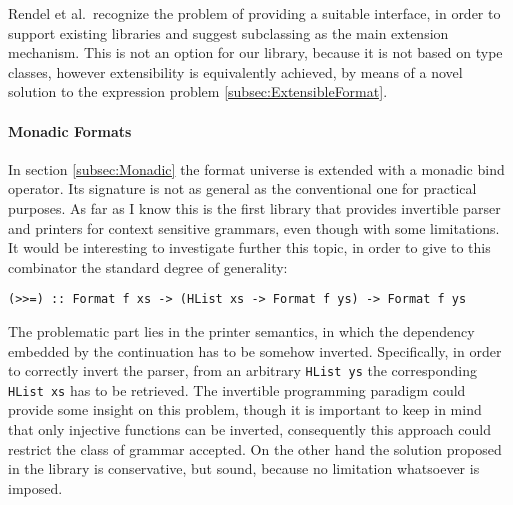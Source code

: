 \documentclass[../Thesis.tex]{subfiles}
\begin{document}
Rendel et al.\ recognize the problem of providing a suitable interface,
in order to support existing libraries and suggest subclassing
as the main extension mechanism. This is not an option
for our library, because it is not based on type classes, however
extensibility is equivalently achieved, by means of a novel
solution to the expression problem \ref{subsec:ExtensibleFormat}.

\paragraph{Monadic Formats}
In section \ref{subsec:Monadic} the format universe is extended 
with a monadic bind operator. 
Its signature is not as general as the conventional one for practical purposes.
As far as I know this is the first library that provides
invertible parser and printers for context sensitive grammars, even
though with some limitations.
It would be interesting to investigate further this topic, in order
to give to this combinator the standard degree of generality:
\begin{verbatim}
(>>=) :: Format f xs -> (HList xs -> Format f ys) -> Format f ys
\end{verbatim}
The problematic part lies in the printer semantics, in which the
dependency embedded by the continuation has to be somehow inverted. Specifically, in order to correctly invert the parser, 
from an arbitrary \texttt{HList ys} the corresponding \texttt{HList xs}
has to be retrieved.
The invertible programming paradigm could provide some insight on this problem, though it is important to keep in mind that only injective functions
can be inverted, consequently this approach could restrict the 
class of grammar accepted.
On the other hand the solution proposed in the library is conservative, but sound, because no limitation whatsoever is imposed.
\end{document}
